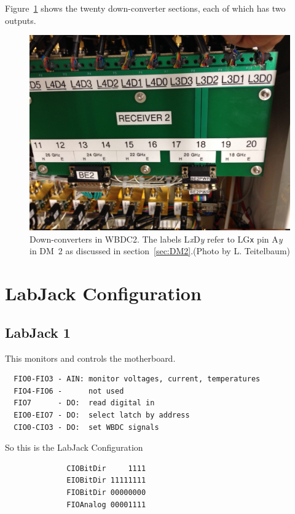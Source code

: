 \documentclass[letterpaper,11pt]{book}
\begin{document}
Figure~\ref{fig:downconv} shows the twenty down-converter sections, each of
which has two outputs.
\begin{figure}[h!tb]
  \begin{center}
    \includegraphics[width=6in]{WBDC2downconv.jpg}
    \caption[Down-converters in WBDC2]{\label{fig:downconv}Down-converters in 
    WBDC2.  The labels  L{\it x}D{\it y}
    refer to LG{\tt x} pin A{\it y} in DM~2 as discussed in 
    section~\ref{sec:DM2}.(Photo by L. Teitelbaum)}
  \end{center}
\end{figure}

\chapter{LabJack Configuration}\label{labjack}

\section{LabJack 1}

This monitors and controls the motherboard.
\begin{verbatim}
  FIO0-FIO3 - AIN: monitor voltages, current, temperatures
  FIO4-FIO6 -      not used
  FIO7      - DO:  read digital in
  EIO0-EIO7 - DO:  select latch by address
  CIO0-CIO3 - DO:  set WBDC signals
\end{verbatim}
So this is the LabJack Configuration
\begin{verbatim}
              CIOBitDir     1111
              EIOBitDir 11111111
              FIOBitDir 00000000
              FIOAnalog 00001111
\end{verbatim}
\end{document}
